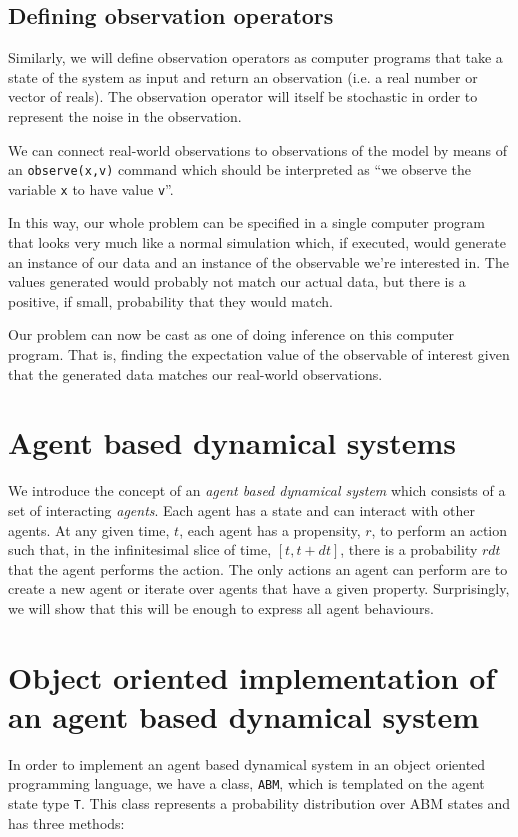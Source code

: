 \documentclass[letterpaper,twocolumn,10pt]{article}
\begin{document}
\subsection{Defining observation operators}
Similarly, we will define observation operators as computer programs that take a state of the system as input and return an observation (i.e. a real number or vector of reals). The observation operator will itself be stochastic in order to represent the noise in the observation.

We can connect real-world observations to observations of the model by means of an \texttt{observe(x,v)} command which should be interpreted as ``we observe the variable \texttt{x} to have value \texttt{v}''.

In this way, our whole problem can be specified in a single computer program that looks very much like a normal simulation which, if executed, would generate an instance of our data and an instance of the observable we're interested in. The values generated would probably not match our actual data, but there is a positive, if small, probability that they would match.

Our problem can now be cast as one of doing inference on this computer program. That is, finding the expectation value of the observable of interest given that the generated data matches our real-world observations.

\section{Agent based dynamical systems}
We introduce the concept of an \textit{agent based dynamical system} which consists of a set of interacting \textit{agents}. Each agent has a state and can interact with other agents. At any given time, $t$, each agent has a propensity, $r$, to perform an action such that, in the infinitesimal slice of time, $[t, t+dt]$, there is a probability $rdt$ that the agent performs the action. The only actions an agent can perform are to create a new agent or iterate over agents that have a given property. Surprisingly, we will show that this will be enough to express all agent behaviours.

\section{Object oriented implementation of an agent based dynamical system}
In order to implement an agent based dynamical system in an object oriented programming language, we have a class, \texttt{ABM}, which is templated on the agent state type \texttt{T}. This class represents a probability distribution over ABM states and has three methods:
\end{document}

